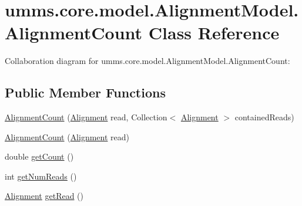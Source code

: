 \hypertarget{classumms_1_1core_1_1model_1_1_alignment_model_1_1_alignment_count}{\section{umms.\+core.\+model.\+Alignment\+Model.\+Alignment\+Count Class Reference}
\label{classumms_1_1core_1_1model_1_1_alignment_model_1_1_alignment_count}
}


Collaboration diagram for umms.\+core.\+model.\+Alignment\+Model.\+Alignment\+Count\+:
\subsection*{Public Member Functions}
\begin{DoxyCompactItemize}
\item 
\hyperlink{classumms_1_1core_1_1model_1_1_alignment_model_1_1_alignment_count_a4334d6a870e3934d4b48ff9ae08e5368}{Alignment\+Count} (\hyperlink{interfaceumms_1_1core_1_1alignment_1_1_alignment}{Alignment} read, Collection$<$ \hyperlink{interfaceumms_1_1core_1_1alignment_1_1_alignment}{Alignment} $>$ contained\+Reads)
\item 
\hyperlink{classumms_1_1core_1_1model_1_1_alignment_model_1_1_alignment_count_a19ec4dc731d940889cb8b6349ec41d78}{Alignment\+Count} (\hyperlink{interfaceumms_1_1core_1_1alignment_1_1_alignment}{Alignment} read)
\item 
double \hyperlink{classumms_1_1core_1_1model_1_1_alignment_model_1_1_alignment_count_a9e4220a3c68d71909bd8daec8361b067}{get\+Count} ()
\item 
int \hyperlink{classumms_1_1core_1_1model_1_1_alignment_model_1_1_alignment_count_a073955ebe911c70f69f26009a4f056a2}{get\+Num\+Reads} ()
\item 
\hyperlink{interfaceumms_1_1core_1_1alignment_1_1_alignment}{Alignment} \hyperlink{classumms_1_1core_1_1model_1_1_alignment_model_1_1_alignment_count_aa7049d2e624f409b1d7ecd20565035f9}{get\+Read} ()
\end{DoxyCompactItemize}



